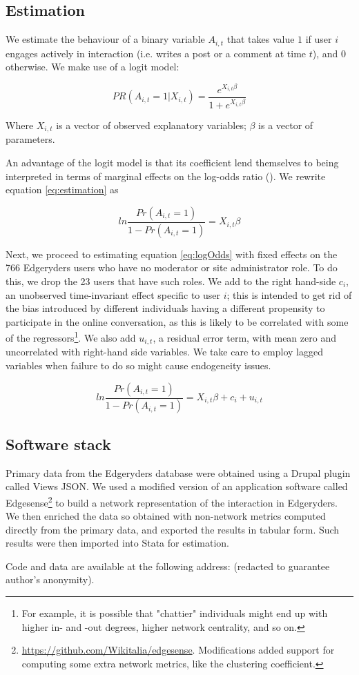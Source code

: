 \subsection{Estimation}

We estimate the behaviour of a binary variable $A_{i,t}$ that takes value $1$ if user $i$ engages actively in interaction (i.e. writes a post or a comment at time $t$), and $0$ otherwise. We make use of a logit model:

\begin{equation}
	PR(A_{i,t}= 1|X_{i,t}) = \frac{e^{X_{i,t}\beta}}{1 + e^{X_{i,t}\beta}}
	\label{eq:estimation}
\end{equation}

Where $X_{i,t}$ is a vector of observed explanatory variables; $\beta$ is a vector of parameters.

An advantage of the logit model is that its coefficient lend themselves to being interpreted in terms of marginal effects on the log-odds ratio (\cite{cameron2005microeconometrics}). We rewrite equation \ref{eq:estimation} as

\begin{equation}
	ln \frac{Pr(A_{i,t} = 1)}{1 - Pr(A_{i,t}=1)} = X_{i,t} \beta 
	\label{eq:logOdds}
\end{equation}

Next, we proceed to estimating equation \ref{eq:logOdds} with fixed effects on the 766 Edgeryders users who have no moderator or site administrator role. To do this, we drop the 23 users that have such roles. We add to the right hand-side
$c_i$, an unobserved time-invariant effect specific to user $i$; this is intended to get rid of the bias introduced by different individuals having a different propensity to participate in the online conversation, as this is likely to be correlated with some of the regressors\footnote{For example, it is possible that "chattier" individuals might end up with higher in- and -out degrees, higher network centrality, and so on. }. We also add $u_{i,t}$, a residual error term, with mean zero and uncorrelated with right-hand side variables. We take care to employ lagged variables when failure to do so might cause endogeneity issues. 

\begin{equation}
	ln \frac{Pr(A_{i,t} = 1)}{1 - Pr(A_{i,t}=1)} = X_{i,t} \beta + c_i + u_{i,t}
	\label{eq:logOddsErrors}
\end{equation}

\subsection{Software stack}
Primary data from the Edgeryders database were obtained using a Drupal plugin called Views JSON. We used a modified version of an application software called Edgesense\footnote{\url{https://github.com/Wikitalia/edgesense}. Modifications added support for computing some extra network metrics, like the clustering coefficient.} to build a network representation of the interaction in Edgeryders. We then enriched the data so obtained with non-network metrics computed directly from the primary data, and exported the results in tabular form. Such results were then imported into Stata for estimation. 

Code and data are available at the following address: (redacted to guarantee author's anonymity).
